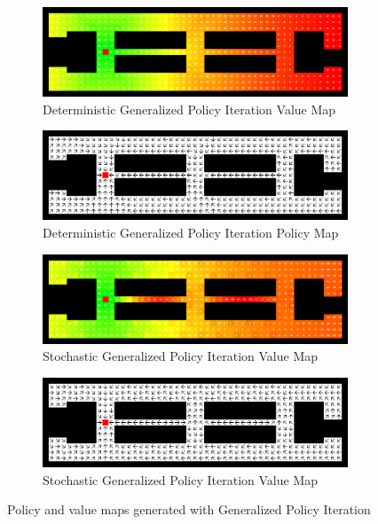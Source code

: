 \documentclass{article}
\begin{document}
\begin{figure}
    \begin{subfigure}{.5\textwidth}
        \centering
        \includegraphics[width=.8\linewidth]{imgs/generalized_policy_iteration_value_map_deterministic.png}
        \caption{Deterministic Generalized Policy Iteration Value Map}
    \end{subfigure}
    \begin{subfigure}{.5\textwidth}
        \centering
        \includegraphics[width=.8\linewidth]{imgs/generalized_policy_iteration_policy_map_deterministic.png}
        \caption{Deterministic Generalized Policy Iteration Policy Map}
    \end{subfigure}
    \begin{subfigure}{.5\textwidth}
        \centering
        \includegraphics[width=.8\linewidth]{imgs/generalized_policy_iteration_value_map_stochastic.png}
        \caption{Stochastic Generalized Policy Iteration Value Map}
    \end{subfigure}
    \begin{subfigure}{.5\textwidth}
        \centering
        \includegraphics[width=.8\linewidth]{imgs/generalized_policy_iteration_policy_map_stochastic.png}
        \caption{Stochastic Generalized Policy Iteration Value Map}
    \end{subfigure}
    \caption{Policy and value maps generated with Generalized Policy Iteration}
\end{figure}
\end{document}
